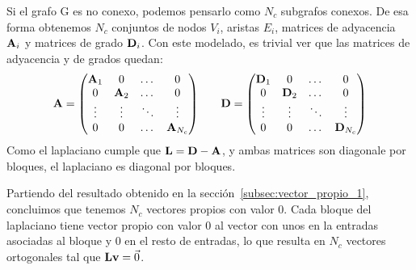 \documentclass{article}
\begin{document}
Si el grafo G es no conexo, podemos pensarlo como $N_c$ subgrafos conexos. De esa forma
obtenemos $N_c$ conjuntos de nodos $V_i$, aristas $E_i$, matrices de adyacencia $\mathbf{A}_i$ y matrices de grado $\mathbf{D}_i$. Con este modelado, es trivial ver que las matrices de adyacencia y de grados quedan:
\begin{equation*}
    \begin{array}{l c r}
        \mathbf{A} = \left(\begin{matrix}
                             \mathbf{A}_1 & 0      & \dots  & 0          \\
                             0      & \mathbf{A}_2 & \dots  & 0          \\
                             \vdots & \vdots & \ddots & \vdots     \\
                             0      & 0      & \dots  & \mathbf{A}_{N_c}
                         \end{matrix}\right)
         &  &
        \mathbf{D} =\left(\begin{matrix}
                             \mathbf{D}_1 & 0       & \dots  & 0           \\
                             0       & \mathbf{D}_2 & \dots  & 0           \\
                             \vdots  & \vdots  & \ddots & \vdots      \\
                             0       & 0       & \dots  & \mathbf{D}_{N_c}
                         \end{matrix}\right)
    \end{array}
\end{equation*}
Como el laplaciano cumple que $\mathbf{L} = \mathbf{D} - \mathbf{A}$, y ambas matrices son diagonale por bloques, el laplaciano es diagonal por bloques.

Partiendo del resultado obtenido en la sección~\ref{subsec:vector_propio_1}, concluimos que tenemos $N_c$ vectores propios con valor 0. Cada bloque del laplaciano tiene vector propio con valor 0 al vector con unos en la entradas asociadas al bloque y 0 en el resto de entradas, lo que resulta en $N_c$ vectores ortogonales tal que $\mathbf{L} \mathbf{v} = \vec{0}$.
\end{document}
